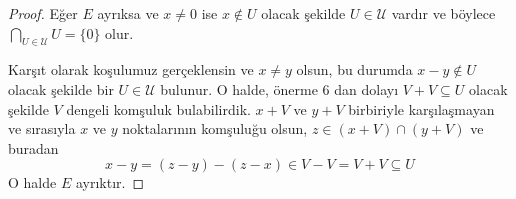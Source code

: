 \documentclass[11pt]{article}
\theoremstyle{plain}
\theoremstyle{definition}
\theoremstyle{remark}
\numberwithin{equation}{section}
\renewcommand{\%}{{\small \%}}
\begin{document}
\begin{proof}
Eğer $E$ ayrıksa ve $x\neq 0$ ise $x\notin U$ olacak şekilde $U\in\mathscr{U}$ vardır ve böylece $\bigcap_{U\in\mathscr{U}}U=\{0\}$ olur.

Karşıt olarak koşulumuz gerçeklensin ve $x\neq y$ olsun, bu durumda $x-y\notin U$ olacak şekilde bir $U\in\mathscr{U}$ bulunur. O halde, önerme 6 dan dolayı $V+V\subseteq U$ olacak şekilde $V$ dengeli komşuluk bulabilirdik. $x+V$ ve $y+V$ birbiriyle karşılaşmayan ve sırasıyla $x$ ve $y$ noktalarının komşuluğu olsun, $z\in(x+V)\cap(y+V)$ ve buradan
\[
x-y=(z-y)-(z-x)\in V-V=V+V\subseteq U
\]
O halde $E$ ayrıktır.
\end{proof}
\end{document}
